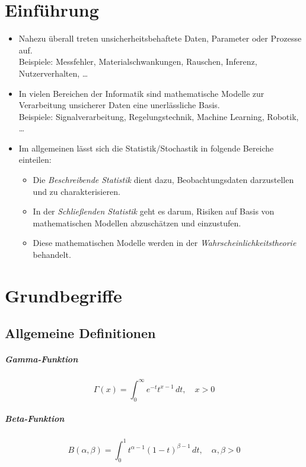 \chapter{Einführung}
    \begin{itemize}
    	\item Nahezu überall treten unsicherheitsbehaftete Daten, Parameter oder Prozesse auf. \\ Beispiele: Messfehler, Materialschwankungen, Rauschen, Inferenz, Nutzerverhalten, \dots
    	\item In vielen Bereichen der Informatik sind mathematische Modelle zur Verarbeitung unsicherer Daten eine unerlässliche Basis. \\ Beispiele: Signalverarbeitung, Regelungstechnik, Machine Learning, Robotik, \dots
    	\item Im allgemeinen lässt sich die Statistik/Stochastik in folgende Bereiche einteilen:
        	\begin{itemize}
        		\item Die \textit{Beschreibende Statistik} dient dazu, Beobachtungsdaten darzustellen und zu charakterisieren.
        		\item In der \textit{Schließenden Statistik} geht es darum, Risiken auf Basis von mathematischen Modellen abzuschätzen und einzustufen.
        		\item Diese mathematischen Modelle werden in der \textit{Wahrscheinlichkeitstheorie} behandelt.
        	\end{itemize}
    \end{itemize}

\chapter{Grundbegriffe}
    \section{Allgemeine Definitionen}
	    \paragraph{Gamma-Funktion}
		    \begin{equation*}
			    \Gamma(x) = \int_{0}^{\infty} \! e^{-t} t^{x - 1} \, dt, \quad x > 0
		    \end{equation*}
	    
	    \paragraph{Beta-Funktion}
		    \begin{equation*}
			    B(\alpha, \beta) = \int_{0}^{1} \! t^{\alpha - 1} (1 - t) ^ { \beta - 1 } \, dt, \quad \alpha, \beta > 0
		    \end{equation*}


